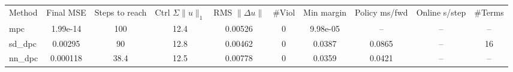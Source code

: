 \begin{tabular}{lccccccccc}
\toprule
Method & Final MSE & Steps to reach & Ctrl $\Sigma\|u\|_1$ & RMS $\|\Delta u\|$ & \#Viol & Min margin & Policy ms/fwd & Online s/step & \#Terms \\
mpc & 1.99e-14 & 100 & 12.4 & 0.00526 & 0 & 9.98e-05 & -- & -- & -- \\
sd\_dpc & 0.00295 & 90 & 12.8 & 0.00462 & 0 & 0.0387 & 0.0865 & -- & 16 \\
nn\_dpc & 0.000118 & 38.4 & 12.5 & 0.00778 & 0 & 0.0359 & 0.0421 & -- & -- \\
\bottomrule
\end{tabular}
